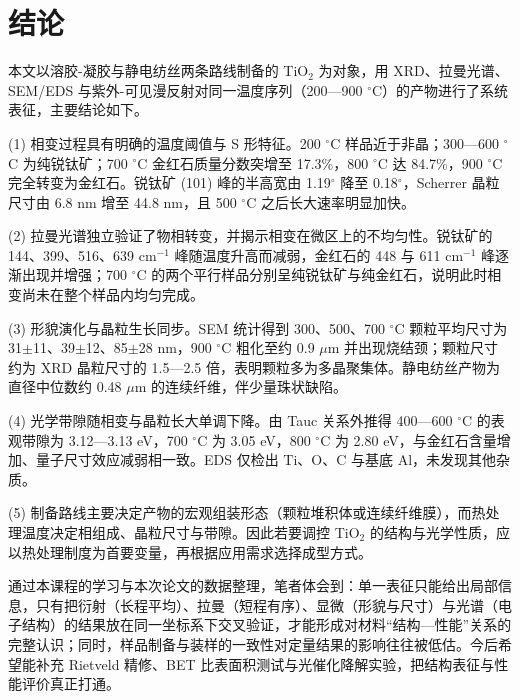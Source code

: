 \section{结\quad 论}

本文以溶胶-凝胶与静电纺丝两条路线制备的 TiO$_2$ 为对象，用 XRD、拉曼光谱、SEM/EDS 与紫外-可见漫反射对同一温度序列（200—900 $^\circ$C）的产物进行了系统表征，主要结论如下。

(1) 相变过程具有明确的温度阈值与 S 形特征。200 $^\circ$C 样品近于非晶；300—600 $^\circ$C 为纯锐钛矿；700 $^\circ$C 金红石质量分数突增至 17.3\%，800 $^\circ$C 达 84.7\%，900 $^\circ$C 完全转变为金红石。锐钛矿 (101) 峰的半高宽由 1.19$^\circ$ 降至 0.18$^\circ$，Scherrer 晶粒尺寸由 6.8 nm 增至 44.8 nm，且 500 $^\circ$C 之后长大速率明显加快。

(2) 拉曼光谱独立验证了物相转变，并揭示相变在微区上的不均匀性。锐钛矿的 144、399、516、639 cm$^{-1}$ 峰随温度升高而减弱，金红石的 448 与 611 cm$^{-1}$ 峰逐渐出现并增强；700 $^\circ$C 的两个平行样品分别呈纯锐钛矿与纯金红石，说明此时相变尚未在整个样品内均匀完成。

(3) 形貌演化与晶粒生长同步。SEM 统计得到 300、500、700 $^\circ$C 颗粒平均尺寸为 31$\pm$11、39$\pm$12、85$\pm$28 nm，900 $^\circ$C 粗化至约 0.9 $\mu$m 并出现烧结颈；颗粒尺寸约为 XRD 晶粒尺寸的 1.5—2.5 倍，表明颗粒多为多晶聚集体。静电纺丝产物为直径中位数约 0.48 $\mu$m 的连续纤维，伴少量珠状缺陷。

(4) 光学带隙随相变与晶粒长大单调下降。由 Tauc 关系外推得 400—600 $^\circ$C 的表观带隙为 3.12—3.13 eV，700 $^\circ$C 为 3.05 eV，800 $^\circ$C 为 2.80 eV，与金红石含量增加、量子尺寸效应减弱相一致。EDS 仅检出 Ti、O、C 与基底 Al，未发现其他杂质。

(5) 制备路线主要决定产物的宏观组装形态（颗粒堆积体或连续纤维膜），而热处理温度决定相组成、晶粒尺寸与带隙。因此若要调控 TiO$_2$ 的结构与光学性质，应以热处理制度为首要变量，再根据应用需求选择成型方式。

通过本课程的学习与本次论文的数据整理，笔者体会到：单一表征只能给出局部信息，只有把衍射（长程平均）、拉曼（短程有序）、显微（形貌与尺寸）与光谱（电子结构）的结果放在同一坐标系下交叉验证，才能形成对材料“结构—性能”关系的完整认识；同时，样品制备与装样的一致性对定量结果的影响往往被低估。今后希望能补充 Rietveld 精修、BET 比表面积测试与光催化降解实验，把结构表征与性能评价真正打通。
